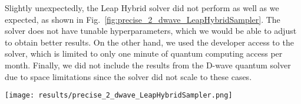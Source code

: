 Slightly unexpectedly, the Leap Hybrid solver did not perform as well as we expected, as shown in Fig.~\ref{fig:precise_2_dwave_LeapHybridSampler}. The solver does not have tunable hyperparameters, which we would be able to adjust to obtain better results. On the other hand, we used the developer access to the solver, which is limited to only one minute of quantum computing access per month. Finally, we did not include the results from the D-wave quantum solver due to space limitations since the solver did not scale to these cases. %

\begin{figure*}[tbh]
    \centering
    \texttt{[image: results/precise\_2\_dwave\_LeapHybridSampler.png]}
    \caption{Precise 2 results using D-Wave's Leap Hybrid solver}
    \label{fig:precise_2_dwave_LeapHybridSampler}
\end{figure*}

